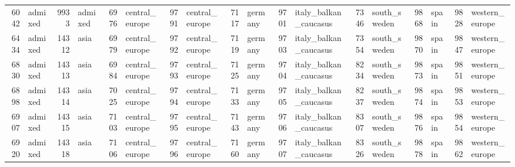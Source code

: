 \begin{table}[h]
{\begin{tabular}{rl|rl|rl|rl|rl|rl|rl|rl|rl}
			6042                   & admixed         & 9933                   & admixed         & 6976                   & central\_europe & 9791                   & central\_europe & 7117                   & germany                 & 9701                   & italy\_balkan\_caucasus & 7346                   & south\_sweden   & 9868                   & spain           & \multicolumn{1}{r}{9828} & western\_europe \\
			6434                   & admixed         & 14312                  & asia            & 6979                   & central\_europe & 9792                   & central\_europe & 7119                   & germany                 & 9703                   & italy\_balkan\_caucasus & 7354                   & south\_sweden   & 9870                   & spain           & \multicolumn{1}{r}{9847} & western\_europe \\
			6830                   & admixed         & 14313                  & asia            & 6984                   & central\_europe & 9793                   & central\_europe & 7125                   & germany                 & 9704                   & italy\_balkan\_caucasus & 8234                   & south\_sweden   & 9873                   & spain           & \multicolumn{1}{r}{9851} & western\_europe \\
			6898                   & admixed         & 14314                  & asia            & 7025                   & central\_europe & 9794                   & central\_europe & 7133                   & germany                 & 9705                   & italy\_balkan\_caucasus & 8237                   & south\_sweden   & 9874                   & spain           & \multicolumn{1}{r}{9853} & western\_europe \\
			6907                   & admixed         & 14315                  & asia            & 7103                   & central\_europe & 9795                   & central\_europe & 7143                   & germany                 & 9706                   & italy\_balkan\_caucasus & 8307                   & south\_sweden   & 9876                   & spain           & \multicolumn{1}{r}{9854} & western\_europe \\
			6920                   & admixed         & 14318                  & asia            & 7106                   & central\_europe & 9796                   & central\_europe & 7160                   & germany                 & 9707                   & italy\_balkan\_caucasus & 8326                   & south\_sweden   & 9878                   & spain           & \multicolumn{1}{r}{9862} & western\_europe \\

\end{tabular}}
\end{table}
